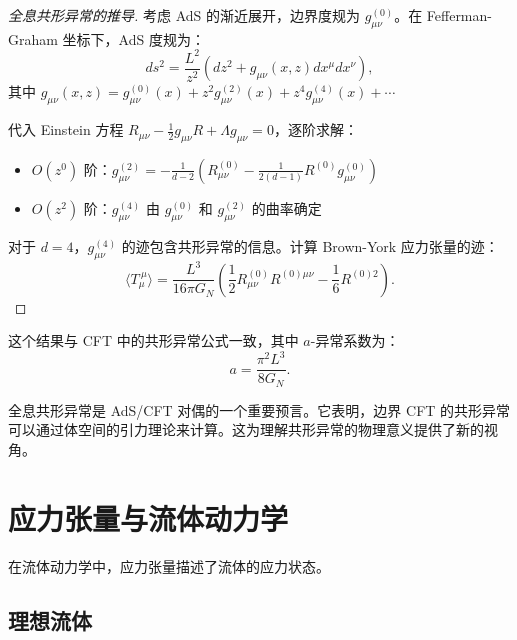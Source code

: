 \begin{proof}[全息共形异常的推导]
考虑 AdS 的渐近展开，边界度规为 $g_{\mu\nu}^{(0)}$。在 Fefferman-Graham 坐标下，AdS 度规为：
\begin{equation}
    ds^2 = \frac{L^2}{z^2} \left(dz^2 + g_{\mu\nu}(x, z) dx^\mu dx^\nu\right),
\end{equation}
其中 $g_{\mu\nu}(x, z) = g_{\mu\nu}^{(0)}(x) + z^2 g_{\mu\nu}^{(2)}(x) + z^4 g_{\mu\nu}^{(4)}(x) + \cdots$

代入 Einstein 方程 $R_{\mu\nu} - \frac{1}{2} g_{\mu\nu} R + \Lambda g_{\mu\nu} = 0$，逐阶求解：
\begin{itemize}
    \item $O(z^0)$ 阶：$g_{\mu\nu}^{(2)} = -\frac{1}{d-2} \left(R_{\mu\nu}^{(0)} - \frac{1}{2(d-1)} R^{(0)} g_{\mu\nu}^{(0)}\right)$
    \item $O(z^2)$ 阶：$g_{\mu\nu}^{(4)}$ 由 $g_{\mu\nu}^{(0)}$ 和 $g_{\mu\nu}^{(2)}$ 的曲率确定
\end{itemize}

对于 $d=4$，$g_{\mu\nu}^{(4)}$ 的迹包含共形异常的信息。计算 Brown-York 应力张量的迹：
\begin{equation}
    \langle T_\mu^{~\mu} \rangle = \frac{L^3}{16\pi G_N} \left(\frac{1}{2} R_{\mu\nu}^{(0)} R^{(0)\mu\nu} - \frac{1}{6} R^{(0)2}\right).
\end{equation}
\end{proof}

这个结果与 CFT 中的共形异常公式一致，其中 $a$-异常系数为\cite{Henningson1998}：
\begin{equation}
    a = \frac{\pi^2 L^3}{8 G_N}.
\end{equation}

\begin{remark}[全息共形异常的意义]
全息共形异常是 AdS/CFT 对偶的一个重要预言。它表明，边界 CFT 的共形异常可以通过体空间的引力理论来计算。这为理解共形异常的物理意义提供了新的视角。
\end{remark}

\section{应力张量与流体动力学}

在流体动力学中，应力张量描述了流体的应力状态。

\subsection{理想流体}

